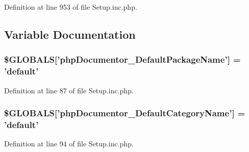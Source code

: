 \-Definition at line 953 of file \-Setup.\-inc.\-php.




\subsection{\-Variable \-Documentation}
\hypertarget{_setup_8inc_8php_a7ef1dde81166092f516ef631d2d7eac7}{
\subsubsection[{\$\-G\-L\-O\-B\-A\-L\-S}]{\setlength{\rightskip}{0pt plus 5cm}\$\-G\-L\-O\-B\-A\-L\-S\mbox{[}'php\-Documentor\-\_\-\-Default\-Package\-Name'\mbox{]} = 'default'}}\label{_setup_8inc_8php_a7ef1dde81166092f516ef631d2d7eac7}


\-Definition at line 87 of file \-Setup.\-inc.\-php.

\hypertarget{_setup_8inc_8php_a2fd65495adf64ec0ca1df0e502ee2e5d}{
\subsubsection[{\$\-G\-L\-O\-B\-A\-L\-S}]{\setlength{\rightskip}{0pt plus 5cm}\$\-G\-L\-O\-B\-A\-L\-S\mbox{[}'php\-Documentor\-\_\-\-Default\-Category\-Name'\mbox{]} = 'default'}}\label{_setup_8inc_8php_a2fd65495adf64ec0ca1df0e502ee2e5d}


\-Definition at line 94 of file \-Setup.\-inc.\-php.

